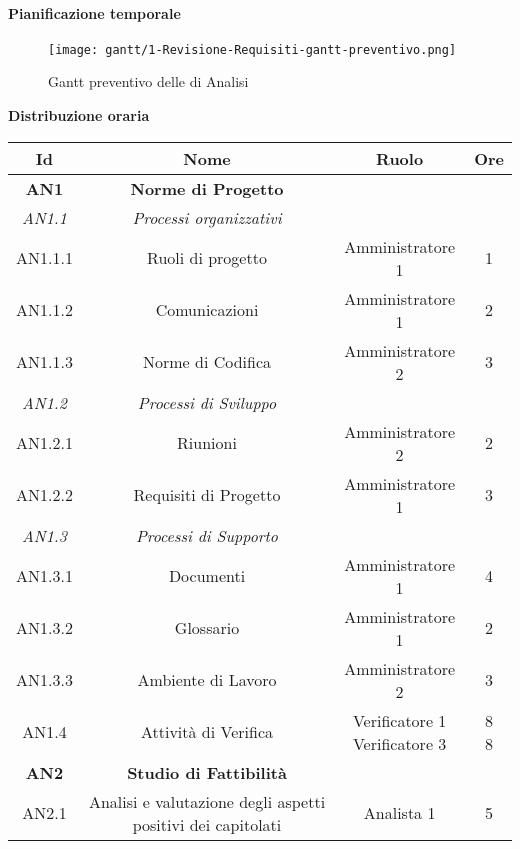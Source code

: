 \documentclass{scalatekids-article}
\begin{document}
\newpage
\paragraph{Pianificazione temporale}
\begin{figure}[H]
  \texttt{[image: gantt/1-Revisione-Requisiti-gantt-preventivo.png]}
  \caption{Gantt preventivo delle  di Analisi}
\end{figure}

\newpage
\textbf{Distribuzione oraria}
\scriptsize
\begin{center}
  \begin{tabular}{| c | c | c | c |}
    \hline
    \textbf{Id} & \textbf{Nome} & \textbf{Ruolo} & \textbf{Ore}\\
    \hline
    \textbf{AN1} & \textbf{Norme di Progetto} & &\\
    \hline
    \textit{AN1.1} & \textit{Processi organizzativi} & &\\
    \hline
    AN1.1.1 & Ruoli di progetto & Amministratore 1 & 1\\
    \hline
    AN1.1.2 & Comunicazioni & Amministratore 1 & 2\\
    \hline
    AN1.1.3 & Norme di Codifica & Amministratore 2 & 3\\
    \hline
    \textit{AN1.2} & \textit{Processi di Sviluppo} & &\\
    \hline
    AN1.2.1 & Riunioni & Amministratore 2 & 2\\
    \hline
    AN1.2.2 & Requisiti di Progetto & Amministratore 1 & 3\\
    \hline
    \textit{AN1.3} & \textit{Processi di Supporto} & &\\
    \hline
    AN1.3.1 & Documenti & Amministratore 1 & 4\\
    \hline
    AN1.3.2 & Glossario & Amministratore 1 & 2\\
    \hline
    AN1.3.3 & Ambiente di Lavoro & Amministratore 2 & 3\\
    \hline
    AN1.4 & Attività di Verifica & \multiLineCell[t]{Verificatore 1\\Verificatore 3} & \multiLineCell[t]{8\\8}\\
    \hline
    \textbf{AN2} & \textbf{Studio di Fattibilità} & &\\
    \hline
    AN2.1 & Analisi e valutazione degli aspetti positivi dei capitolati & Analista 1 & 5\\
    \hline

\end{tabular}
\end{center}
\end{document}
